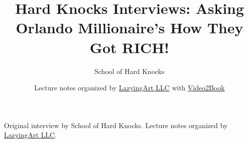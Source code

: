 \documentclass[11pt,oneside]{book}
\begin{document}
\frontmatter
\title{Hard Knocks Interviews: Asking Orlando Millionaire's How They Got RICH!}
\author{School of Hard Knocks}
\date{Lecture notes organized by \href{https://lazying.art}{LazyingArt LLC} with \href{https://github.com/lachlanchen/Video2Book}{Video2Book}}
\maketitle
\begin{center}
\small Original interview by School of Hard Knocks. Lecture notes organized by \href{https://lazying.art}{LazyingArt LLC}.
\end{center}
\clearpage
\mainmatter

\end{document}
